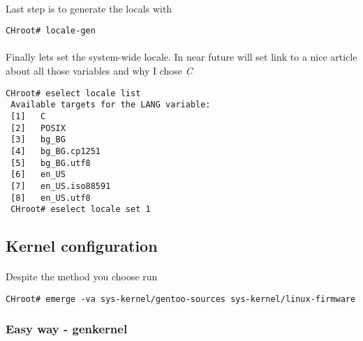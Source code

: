 \documentclass[10pt,a4paper]{article}
\begin{document}
\begin{enumerate}

                    
                    \paragraph{} Last step is to generate the locals with
                    
\begin{lstlisting}[style=BashInputCHRoot]
 CHroot# locale-gen
\end{lstlisting}      
                    
                    \paragraph{} Finally lets set the system-wide locale. In near future will set link to a nice article about all those variables and why I chose \textit{C}

\begin{lstlisting}[style=BashInputCHRoot]
 CHroot# eselect locale list
 Available targets for the LANG variable:
 [1]   C
 [2]   POSIX
 [3]   bg_BG
 [4]   bg_BG.cp1251
 [5]   bg_BG.utf8
 [6]   en_US
 [7]   en_US.iso88591
 [8]   en_US.utf8
 CHroot# eselect locale set 1
\end{lstlisting}                        
                    
                \end{enumerate}

        \newpage
        \subsection{Kernel configuration}
            
            \paragraph{} Despite the method you choose run

\begin{lstlisting}[style=BashInputCHRoot]
 CHroot# emerge -va sys-kernel/gentoo-sources sys-kernel/linux-firmware
\end{lstlisting}
            
            \newpage 
            \subsubsection{Easy way - genkernel}
            
\end{document}
